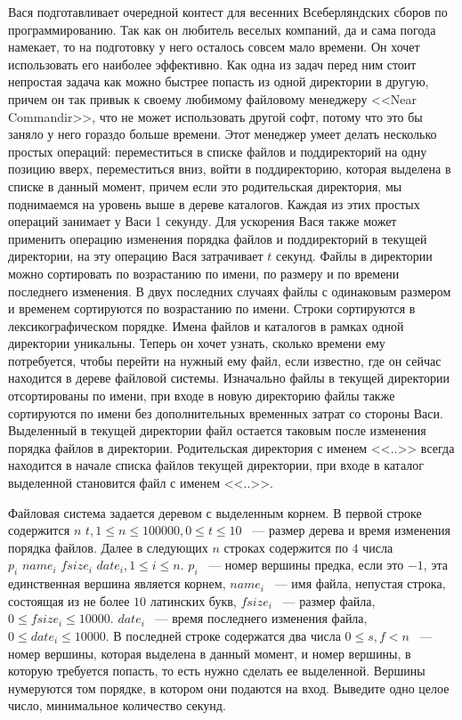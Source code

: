 Вася подготавливает очередной контест для весенних
Всеберляндских сборов по программированию. Так как
он любитель веселых компаний, да и сама погода
намекает, то на подготовку у него осталось совсем мало времени.
Он хочет использовать его наиболее эффективно. Как одна из задач
перед ним стоит непростая задача как можно быстрее попасть
из одной директории в другую, причем он так привык к своему
любимому файловому менеджеру <<Near Commandir>>, что не может
использовать другой софт, потому что это бы заняло у него
гораздо больше времени. Этот менеджер умеет делать
несколько простых операций: переместиться в списке файлов и поддиректорий
на одну позицию вверх, переместиться вниз, войти в поддиректорию,
которая выделена в списке в данный момент, причем если это родительская
директория, мы поднимаемся на уровень выше в дереве каталогов.
Каждая из этих простых операций занимает у Васи 1 секунду.
Для ускорения Вася также может применить операцию изменения порядка файлов
и поддиректорий в текущей директории, на эту операцию Вася затрачивает $t$
секунд. Файлы в директории можно сортировать по возрастанию
по имени, по размеру и по времени последнего изменения. В двух последних
случаях файлы с одинаковым размером и временем сортируются по
возрастанию по имени. Строки сортируются в лексикографическом порядке.
Имена файлов и каталогов в рамках одной директории уникальны.
Теперь он хочет узнать, сколько времени ему потребуется,
чтобы перейти на нужный ему файл, если известно, где он сейчас
находится в дереве файловой системы. Изначально файлы в текущей директории
отсортированы по имени, при входе в новую директорию файлы
также сортируются по имени без дополнительных временных затрат
со стороны Васи. Выделенный в текущей директории файл
остается таковым после изменения порядка файлов в директории.
Родительская директория с именем <<..>> всегда находится в начале списка
файлов текущей директории, при входе в каталог выделенной
становится файл с именем <<..>>.

\InputFile
Файловая система задается деревом с выделенным корнем. В первой строке
содержится $n \,\, t, 1 \le n \le 100000, 0 \le t \le 10$
~--- размер дерева и время изменения порядка файлов. Далее в следующих
$n$ строках содержится по $4$ числа
$p_i \,\, name_i \,\, fsize_i \,\, date_i, 1\le i \le n$.
$p_i$ ~--- номер вершины предка, если это $-1$, эта единственная вершина
является корнем, $name_i$ ~--- имя файла, непустая строка,
состоящая из не более $10$ латинских букв, $fsize_i$ ~--- размер файла,
$0 \le fsize_i \le 10000$.
$date_i$ ~--- время последнего изменения файла, $0 \le date_i \le 10000$.
В последней строке содержатся два числа $0 \le s, f < n$ ~---
номер вершины, которая выделена в данный момент, и номер вершины,
в которую требуется попасть, то есть нужно сделать
ее выделенной. Вершины нумеруются том порядке,
в котором они подаются на вход.
\OutputFile
Выведите одно целое число, минимальное количество секунд.
